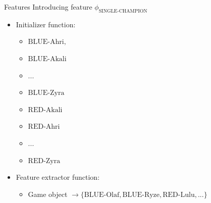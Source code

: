 \begin{frame}{Features}
Introducing feature $\phi_\text{SINGLE-CHAMPION}$
\begin{itemize}
\item Initializer function: 
	\begin{itemize}
	\item $\text{BLUE-Ahri},$
	\item $\text{BLUE-Akali}$
	\item ...
	\item $\text{BLUE-Zyra}$
	\item $\text{RED-Akali}$
	\item $\text{RED-Ahri}$
	\item ...
	\item $\text{RED-Zyra}$
	\end{itemize}
\item Feature extractor function:  
	\begin{itemize}
	\item Game object $\rightarrow \{\text{BLUE-Olaf}, \text{BLUE-Ryze}, \text{RED-Lulu}, ...\}$
	\end{itemize}
\end{itemize}
\end{frame}